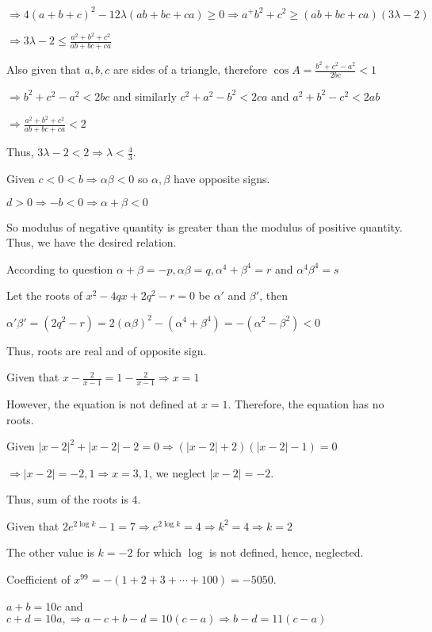   $\Rightarrow 4(a + b + c)^2 - 12\lambda(ab + bc + ca)\geq 0\Rightarrow a^ + b^2 + c^2\geq (ab + bc +
  ca)(3\lambda - 2)$

  $\Rightarrow 3\lambda - 2\leq \frac{a^2 + b^2 + c^2}{ab + bc + ca}$

  Also given that $a, b, c$ are sides of a triangle, therefore $\cos A = \frac{b^2 + c^2 - a^2}{2bc} < 1$

  $\Rightarrow b^2 + c^2 - a^2 < 2bc$ and similarly $c^2 + a^2 - b^2 < 2ca$ and $a^2 + b^2 - c^2 < 2ab$

  $\Rightarrow \frac{a^2 + b^2 + c^2}{ab + bc + ca} < 2$

  Thus, $3\lambda - 2 < 2\Rightarrow \lambda < \frac{4}{3}$.
\item Given $c < 0 < b\Rightarrow \alpha\beta < 0$ so $\alpha, \beta$ have opposite signs.

  $d > 0 \Rightarrow -b < 0\Rightarrow \alpha + \beta < 0$

  So modulus of negative quantity is greater than the modulus of positive quantity. Thus, we have the
  desired relation.
\item According to question $\alpha + \beta = -p, \alpha\beta = q, \alpha^4 + \beta^4 = r$ and
  $\alpha^4\beta^4 = s$

  Let the roots of $x^2 - 4qx + 2q^2 - r = 0$ be $\alpha'$ and $\beta'$, then

  $\alpha'\beta' = (2q^2 - r) = 2(\alpha\beta)^2 - \left(\alpha^4 + \beta^4\right) = -\left(\alpha^2
  - \beta^2\right) < 0$

  Thus, roots are real and of opposite sign.
\item Given that $x - \frac{2}{x - 1} = 1 - \frac{2}{x - 1}\Rightarrow x = 1$

  However, the equation is not defined at $x = 1$. Therefore, the equation has no roots.
\item Given $|x - 2|^2 + |x - 2| - 2 = 0\Rightarrow \left(|x - 2| + 2\right)\left(|x - 2| - 1\right) = 0$

  $\Rightarrow |x - 2| = -2, 1\Rightarrow x = 3, 1$, we neglect $|x - 2| = -2$.

  Thus, sum of the roots is $4$.
\item Given that $2e^{2\log k} - 1 = 7 \Rightarrow e^{2\log k} = 4 \Rightarrow k^2 = 4 \Rightarrow k = 2$

  The other value is $k = -2$ for which $\log$ is not defined, hence, neglected.
\item Coefficient of $x^{99} = -(1 + 2 + 3 + \cdots + 100) = -5050$.
\item $a + b = 10c$ and $c + d = 10a, \Rightarrow a - c + b - d = 10(c - a)\Rightarrow b - d = 11(c - a)$

